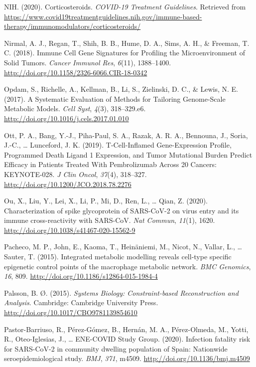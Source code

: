 \documentclass[12pt,twoside,openany,\mydriver]{thesis}  %
\begin{document}
\leavevmode\hypertarget{ref-nih_corticosteroids_2020}{}%
NIH. (2020). Corticosteroids. \emph{COVID-19 Treatment Guidelines}. Retrieved from \url{https://www.covid19treatmentguidelines.nih.gov/immune-based-therapy/immunomodulators/corticosteroids/}

\leavevmode\hypertarget{ref-nirmal_immune_2018}{}%
Nirmal, A. J., Regan, T., Shih, B. B., Hume, D. A., Sims, A. H., \& Freeman, T. C. (2018). Immune Cell Gene Signatures for Profiling the Microenvironment of Solid Tumors. \emph{Cancer Immunol Res}, \emph{6}(11), 1388--1400. \url{http://doi.org/10.1158/2326-6066.CIR-18-0342}

\leavevmode\hypertarget{ref-opdam_systematic_2017}{}%
Opdam, S., Richelle, A., Kellman, B., Li, S., Zielinski, D. C., \& Lewis, N. E. (2017). A Systematic Evaluation of Methods for Tailoring Genome-Scale Metabolic Models. \emph{Cell Syst}, \emph{4}(3), 318--329.e6. \url{http://doi.org/10.1016/j.cels.2017.01.010}

\leavevmode\hypertarget{ref-ott_t-cell-inflamed_2019}{}%
Ott, P. A., Bang, Y.-J., Piha-Paul, S. A., Razak, A. R. A., Bennouna, J., Soria, J.-C., \ldots{} Lunceford, J. K. (2019). T-Cell-Inflamed Gene-Expression Profile, Programmed Death Ligand 1 Expression, and Tumor Mutational Burden Predict Efficacy in Patients Treated With Pembrolizumab Across 20 Cancers: KEYNOTE-028. \emph{J Clin Oncol}, \emph{37}(4), 318--327. \url{http://doi.org/10.1200/JCO.2018.78.2276}

\leavevmode\hypertarget{ref-ou_characterization_2020}{}%
Ou, X., Liu, Y., Lei, X., Li, P., Mi, D., Ren, L., \ldots{} Qian, Z. (2020). Characterization of spike glycoprotein of SARS-CoV-2 on virus entry and its immune cross-reactivity with SARS-CoV. \emph{Nat Commun}, \emph{11}(1), 1620. \url{http://doi.org/10.1038/s41467-020-15562-9}

\leavevmode\hypertarget{ref-pacheco_integrated_2015}{}%
Pacheco, M. P., John, E., Kaoma, T., Heinäniemi, M., Nicot, N., Vallar, L., \ldots{} Sauter, T. (2015). Integrated metabolic modelling reveals cell-type specific epigenetic control points of the macrophage metabolic network. \emph{BMC Genomics}, \emph{16}, 809. \url{http://doi.org/10.1186/s12864-015-1984-4}

\leavevmode\hypertarget{ref-palsson_systems_2015}{}%
Palsson, B. Ø. (2015). \emph{Systems Biology: Constraint-based Reconstruction and Analysis}. Cambridge: Cambridge University Press. \url{http://doi.org/10.1017/CBO9781139854610}

\leavevmode\hypertarget{ref-pastor-barriuso_infection_2020}{}%
Pastor-Barriuso, R., Pérez-Gómez, B., Hernán, M. A., Pérez-Olmeda, M., Yotti, R., Oteo-Iglesias, J., \ldots{} ENE-COVID Study Group. (2020). Infection fatality risk for SARS-CoV-2 in community dwelling population of Spain: Nationwide seroepidemiological study. \emph{BMJ}, \emph{371}, m4509. \url{http://doi.org/10.1136/bmj.m4509}
\end{document}
